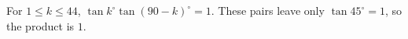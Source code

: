 For $1\le k\le44$, $\tan k^\circ\tan(90-k)^\circ=1$. These pairs leave only $\tan45^\circ=1$, so the product is $\boxed1$.

